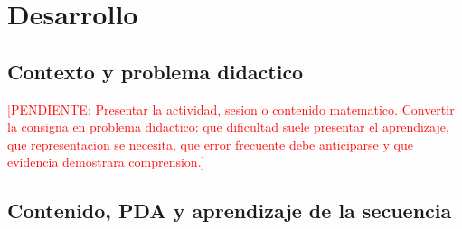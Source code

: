 \documentclass[
	spanish,
	letterpaper, oneside
]{article}
\newcommand{\pendiente}[1]{\textcolor{red}{[PENDIENTE: #1]}}
\begin{document}
%
%
\section{Desarrollo}

\subsection{Contexto y problema didactico}

\pendiente{Presentar la actividad, sesion o contenido matematico. Convertir la consigna en problema didactico: que dificultad suele presentar el aprendizaje, que representacion se necesita, que error frecuente debe anticiparse y que evidencia demostrara comprension.}

\subsection{Contenido, PDA y aprendizaje de la secuencia}
\end{document}
